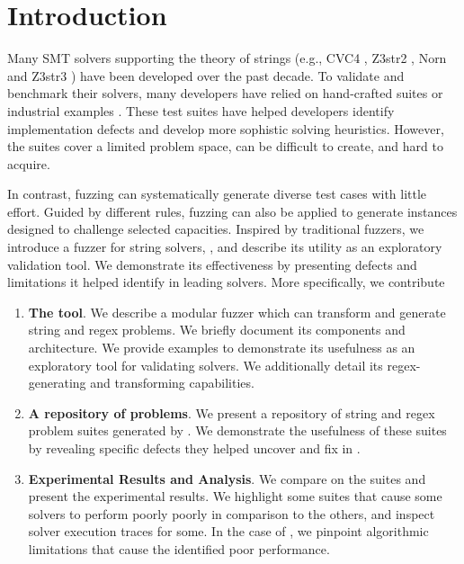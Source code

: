\section{Introduction}

    Many SMT solvers supporting the theory of strings (e.g., CVC4 \cite{cvc4},  Z3str2 \cite{z3str2}, Norn \cite{norn} 
    and Z3str3 \cite{z3str3}) have been developed over the past decade. 
    To validate and benchmark their solvers, many developers have relied on hand-crafted suites \cite{cvc4-tests} 
    \cite{z3str3-tests} \cite{z3str2-tests} or industrial examples \cite{kaluza} \cite{kausler}. 
    These test suites have helped developers identify implementation defects and develop more sophistic solving heuristics. 
    However, the suites cover a limited problem space, can be difficult to create, and hard to acquire.
    
    In contrast, fuzzing can systematically generate diverse test cases with little effort. 
    Guided by different rules, fuzzing can also be applied to generate instances designed to challenge selected capacities. 
    Inspired by traditional fuzzers, we introduce a fuzzer for string solvers, \fuzzer{}, 
    and describe its utility as an exploratory validation tool. 
    We demonstrate its effectiveness by presenting defects and limitations it helped identify in leading solvers.
    More specifically, we contribute
    \begin{enumerate}
        \item \textbf{The \fuzzer{} tool}. We describe a modular fuzzer which can transform and generate \smtfull{} string and regex problems. We briefly document its components and architecture. 
        We provide examples to demonstrate its usefulness as an exploratory tool for validating solvers. 
        We additionally detail its regex-generating and transforming capabilities.
        \item \textbf{A repository of \smtfull{} problems}. We present a repository of \smtfull{} string and regex problem suites 
        generated by \fuzzer{}. We demonstrate the usefulness of these suites by revealing specific defects they helped uncover and fix in \us{}.
        \item \textbf{Experimental Results and Analysis}. We compare \theSolvers{} on the \fuzzer{} suites and present the experimental results. 
        We highlight some suites that cause some solvers to perform poorly poorly in comparison to the others,
        and inspect solver execution traces for some. In the case of \us{}, we
        pinpoint algorithmic limitations that cause the identified poor performance.
    \end{enumerate}
